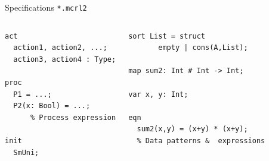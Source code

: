 \documentclass[aspectratio=169]{beamer}
\begin{document}




\begin{frame}[fragile]{Specifications \texttt{*.mcrl2}}

\begin{columns}
  \begin{lstlisting}
act
  action1, action2, ...;
  action3, action4 : Type;

proc
  P1 = ...;
  P2(x: Bool) = ...;
      % Process expression

init
  SmUni;
\end{lstlisting}
  \begin{lstlisting}
sort List = struct
       empty | cons(A,List);

map sum2: Int # Int -> Int;

var x, y: Int;

eqn 
  sum2(x,y) = (x+y) * (x+y);
  % Data patterns &  expressions

\end{lstlisting}
\end{columns}


\end{frame}
\end{document}

